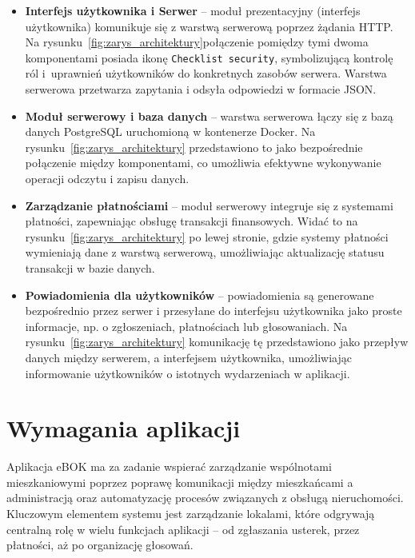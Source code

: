\begin{itemize}

	\item \textbf{Interfejs użytkownika i Serwer} -- moduł prezentacyjny (interfejs użytkownika) komunikuje się z warstwą serwerową poprzez żądania HTTP. Na rysunku~\ref{fig:zarys_architektury}połączenie pomiędzy tymi dwoma komponentami posiada ikonę \texttt{Checklist security}, symbolizującą kontrolę ról i~uprawnień użytkowników do konkretnych zasobów serwera. Warstwa serwerowa przetwarza zapytania i odsyła odpowiedzi w formacie JSON.

	\item \textbf{Moduł serwerowy i baza danych} -- warstwa serwerowa łączy się z bazą danych PostgreSQL uruchomioną w kontenerze Docker. Na rysunku~\ref{fig:zarys_architektury} przedstawiono to jako bezpośrednie połączenie między komponentami, co umożliwia efektywne wykonywanie operacji odczytu i zapisu danych.

	\item \textbf{Zarządzanie płatnościami} -- moduł serwerowy integruje się z systemami płatności, zapewniając obsługę transakcji finansowych. Widać to na rysunku~\ref{fig:zarys_architektury} po lewej stronie, gdzie systemy płatności wymieniają dane z warstwą serwerową, umożliwiając aktualizację statusu transakcji w bazie danych.

	\item \textbf{Powiadomienia dla użytkowników} -- powiadomienia są generowane bezpośrednio przez serwer i przesyłane do interfejsu użytkownika jako proste informacje, np. o zgłoszeniach, płatnościach lub głosowaniach. Na rysunku~\ref{fig:zarys_architektury} komunikację tę przedstawiono jako przepływ danych między serwerem, a interfejsem użytkownika, umożliwiając informowanie użytkowników o istotnych wydarzeniach w aplikacji.
	
\end{itemize}


\section{Wymagania aplikacji}

Aplikacja eBOK ma za zadanie wspierać zarządzanie wspólnotami mieszkaniowymi poprzez poprawę komunikacji między mieszkańcami a administracją oraz automatyzację procesów związanych z obsługą nieruchomości. Kluczowym elementem systemu jest zarządzanie lokalami, które odgrywają centralną rolę w wielu funkcjach aplikacji – od zgłaszania usterek, przez płatności, aż po organizację głosowań.

